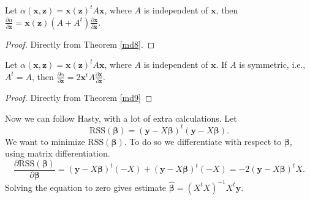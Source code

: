 \begin{theorem} \label{md9}
    Let $\alpha(\bm{x}, \bm{z}) = \bm{x}(\bm{z})^t A \bm{x}$, where $A$ is independent of $\bm{x}$, then $\frac{\partial \alpha}{\partial \bm{z}} = \bm{x}(\bm{z}) (A + A^t) \frac{\partial \bm{x}}{\partial \bm{z}}$.
\end{theorem}

\begin{proof}
    Directly from Theorem \ref{md8}.
\end{proof}


\begin{theorem} \label{md10}
    Let $\alpha(\bm{x}, \bm{z}) = \bm{x}(\bm{z})^t A \bm{x}$, where $A$ is independent of $\bm{x}$.
    If $A$ is symmetric, i.e., $A^t = A$, then $\frac{\partial \alpha}{\partial \bm{z}} = 2 \bm{x}^t A \frac{\partial \bm{x}}{\partial \bm{z}}$.
\end{theorem}

\begin{proof}
    Directly from Theorem \ref{md9}
\end{proof}


Now we can follow Hasty, with a lot of extra calculations.
Let
\begin{equation*}
    \mathrm{RSS}(\bm{\beta}) = (\bm{y} - X\bm{\beta})^t (\bm{y} - X\bm{\beta}).
\end{equation*}
We want to minimize $\mathrm{RSS}(\bm{\beta})$.
To do so we differentiate with respect to $\bm{\beta}$, using matrix differentiation.
\begin{equation*}
    \frac{\partial \mathrm{RSS}(\bm{\beta})}{\partial \bm{\beta}}
        = (\bm{y} - X\bm{\beta})^t(-X) + (\bm{y} - X\bm{\beta})^t(-X)
        = -2(\bm{y} - X\bm{\beta})^t X.
\end{equation*}
Solving the equation to zero gives estimate $\hat{\bm{\beta}} = (X^t X)^{-1} X^t \bm{y}$.

